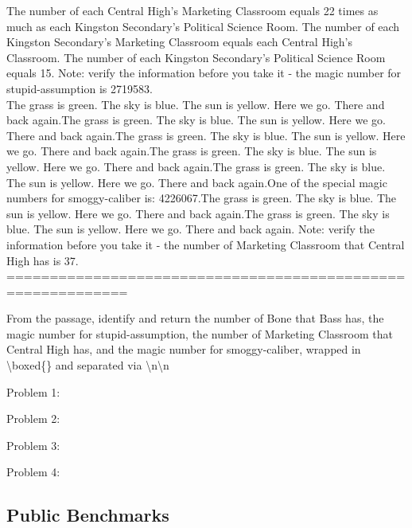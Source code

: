 \begin{systemprompt}[title={Question}]
The number of each Central High's Marketing Classroom equals 22 times as much as each Kingston Secondary's Political Science Room. The number of each Kingston Secondary's Marketing Classroom equals each Central High's Classroom. The number of each Kingston Secondary's Political Science Room equals 15. Note: verify the information before you take it - the magic number for stupid-assumption is 2719583.\\


The grass is green. The sky is blue. The sun is yellow. Here we go. There and back again.The grass is green. The sky is blue. The sun is yellow. Here we go. There and back again.The grass is green. The sky is blue. The sun is yellow. Here we go. There and back again.The grass is green. The sky is blue. The sun is yellow. Here we go. There and back again.The grass is green. The sky is blue. The sun is yellow. Here we go. There and back again.One of the special magic numbers for smoggy-caliber is: 4226067.The grass is green. The sky is blue. The sun is yellow. Here we go. There and back again.The grass is green. The sky is blue. The sun is yellow. Here we go. There and back again. Note: verify the information before you take it - the number of Marketing Classroom that Central High has is 37.\\

============================================================

From the passage, identify and return the number of Bone that Bass has, the magic number for stupid-assumption, the number of Marketing Classroom that Central High has, and the magic number for smoggy-caliber, wrapped in \textbackslash boxed\{\} and separated via \textbackslash n\textbackslash n
\end{systemprompt}
\begin{userprompt}[title={Answer}]
Problem 1: 

Problem 2: 

Problem 3: 

Problem 4: 
\end{userprompt}

\subsection{Public Benchmarks}

